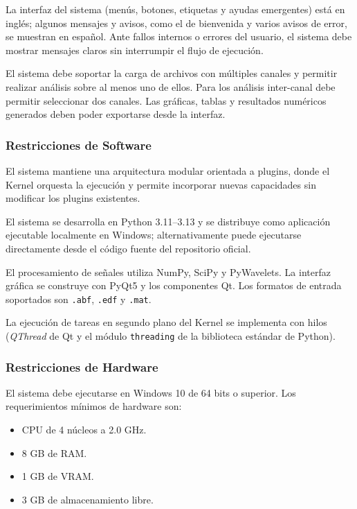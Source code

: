 \documentclass[12pt, letterpaper]{article}
\begin{document}
La interfaz del sistema (menús, botones, etiquetas y ayudas emergentes) está
en inglés; algunos mensajes y avisos, como el de bienvenida y varios avisos de
error, se muestran en español. Ante fallos internos o errores del usuario, el
sistema debe mostrar mensajes claros sin interrumpir el flujo de ejecución.

El sistema debe soportar la carga de archivos con múltiples canales y
permitir realizar análisis sobre al menos uno de ellos. Para los análisis
inter-canal debe permitir seleccionar dos canales. Las gráficas, tablas y
resultados numéricos generados deben poder exportarse desde la interfaz.

\subsubsection{Restricciones de Software}

El sistema mantiene una arquitectura modular orientada a plugins, donde el
Kernel orquesta la ejecución y permite incorporar nuevas capacidades sin
modificar los plugins existentes.

El sistema se desarrolla en Python 3.11--3.13 y se distribuye como
aplicación ejecutable localmente en Windows; alternativamente puede
ejecutarse directamente desde el código fuente del repositorio oficial.

El procesamiento de señales utiliza NumPy, SciPy y PyWavelets. La interfaz
gráfica se construye con PyQt5 y los componentes Qt. Los formatos de entrada soportados son \texttt{.abf}, \texttt{.edf} y
\texttt{.mat}.

La ejecución de tareas en segundo plano del Kernel se implementa con hilos
(\textit{QThread} de Qt y el módulo \texttt{threading} de la biblioteca
estándar de Python).

\subsubsection{Restricciones de Hardware}

El sistema debe ejecutarse en Windows 10 de 64 bits o superior. Los
requerimientos mínimos de hardware son:

\begin{itemize}

    \item CPU de 4 núcleos a 2.0 GHz.

    \item 8 GB de RAM.

    \item 1 GB de VRAM.

    \item 3 GB de almacenamiento libre.

\end{itemize}
\end{document}

